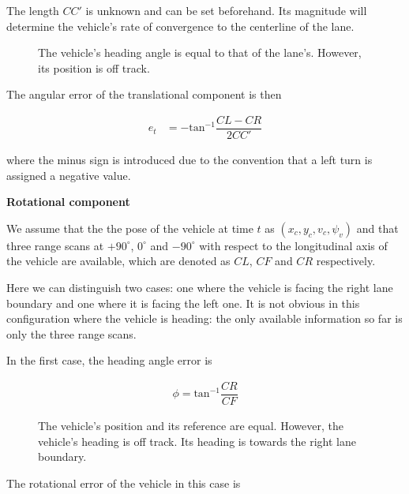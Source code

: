 \documentclass[oneside,12pt]{article}
\begin{document}
    The length $CC'$ is unknown and can be set beforehand. Its magnitude
    will determine the vehicle's rate of convergence to the centerline of the
    lane.

    \begin{figure}[H]\centering
      \scalebox{1}{}
      \caption{The vehicle's heading angle is equal to that of the lane's.
        However, its position is off track.}
      \label{fig:centerline_pid_translation}
    \end{figure}

    The angular error of the translational component is then

    \begin{align}
      e_t &= -\text{tan}^{-1}\dfrac{CL-CR}{2CC'}
    \end{align}

    where the minus sign is introduced due to the
    convention that a left turn is assigned a negative value.

    \textbf{Rotational component}


    We assume that the the pose of the vehicle at time $t$ as
    $(x_c, y_c, v_c, \psi_v)$ and that three range scans
    at $+90^\circ$, $0^\circ$ and $-90^\circ$ with respect to the
    longitudinal axis of the vehicle are available, which are denoted as
    $CL$, $CF$ and $CR$ respectively.

    Here we can distinguish two cases: one where the vehicle is facing the right
    lane boundary and one where it is facing the left one. It is not obvious
    in this configuration where the vehicle is heading: the only available
    information so far is only the three range scans.

    In the first case, the heading angle error is

    \begin{align}
      \phi = \text{tan}^{-1}\dfrac{CR}{CF}
    \end{align}

    \begin{figure}[H]\centering
      \scalebox{1}{}
      \caption{The vehicle's position and its reference are equal. However,
        the vehicle's heading is off track. Its heading is towards the right
        lane boundary.}
      \label{}
    \end{figure}

    The rotational error of the vehicle in this case is
\end{document}
